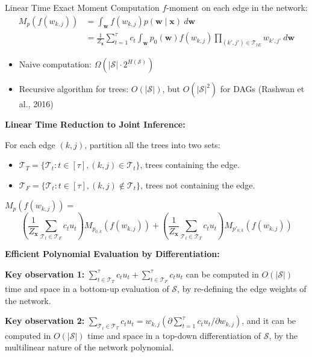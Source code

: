 \documentclass[final,20pt]{beamer}
\newlength{\onecolwid}
\begin{document}
\begin{frame}[t]
\begin{columns}[t]
\begin{column}{\onecolwid}
\begin{block}{Linear Time Exact Moment Computation}
$f$-moment on each edge in the network:
\begin{align*}
M_p(f(w_{k,j})) &= \int_{\mathbf{w}}f(w_{k,j})p(\mathbf{w}\mid\mathbf{x})~d\mathbf{w} \\
&= \frac{1}{Z_{\mathbf{x}}}\sum_{t=1}^{\tau} c_t\int_{\mathbf{w}}p_0(\mathbf{w})f(w_{k,j})\prod_{(k',j')\in\mathcal{T}_{tE}}w_{k',j'}~d\mathbf{w} 
\end{align*}
\begin{itemize}
  \item   Naive computation: $\Omega(|\mathcal{S}|\cdot 2^{H(\mathcal{S})})$
  \item   Recursive algorithm for trees: $O(|\mathcal{S}|)$, but $O(|\mathcal{S}|^2)$ for DAGs (Rashwan et al., 2016)
\end{itemize}

\textcolor{CMURed}{\textbf{Linear Time Reduction to Joint Inference:}}

For each edge $(k,j)$, partition all the trees into two sets:
\begin{itemize}
  \item  $\mathcal{T}_T = \{\mathcal{T}_t: t\in[\tau], (k, j)\in \mathcal{T}_t\}$, trees containing the edge.
  \item  $\mathcal{T}_F = \{\mathcal{T}_t: t\in[\tau], (k, j)\not\in \mathcal{T}_t\}$, trees not containing the edge.
\end{itemize}

$M_p(f(w_{k,j})) =$
\begin{equation}
\left(\frac{1}{Z_{\mathbf{x}}}\sum_{\mathcal{T}_t\in\mathcal{T}_F} c_t u_t\right) M_{p_{0,k}}(f(w_{k,j})) + \left(\frac{1}{Z_{\mathbf{x}}}\sum_{\mathcal{T}_t\in\mathcal{T}_T} c_t u_t\right)M_{p'_{0,k}}(f(w_{k,j}))
\end{equation}

\textcolor{CMURed}{\textbf{Efficient Polynomial Evaluation by Differentiation: }}

\textcolor{CMURed}{\textbf{Key observation 1: }}$\sum_{t\in \mathcal{T}_T}^{\tau}c_tu_t + \sum_{t\in \mathcal{T}_F}^{\tau}c_tu_t$ can be computed in $O(|\mathcal{S}|)$ time and space in a bottom-up evaluation of $\mathcal{S}$, by re-defining the edge weights of the network.

\textcolor{CMURed}{\textbf{Key observation 2: }}$\sum_{\mathcal{T}_t\in\mathcal{T}_T} c_t u_t = w_{k,j}\left(\partial\sum_{t=1}^{\tau}c_tu_t/\partial w_{k,j}\right)$, and it can be computed in $O(|\mathcal{S}|)$ time and space in a top-down differentiation of $\mathcal{S}$, by the multilinear nature of the network polynomial.


\end{block}
\end{column}
\end{columns}
\end{frame}
\end{document}
